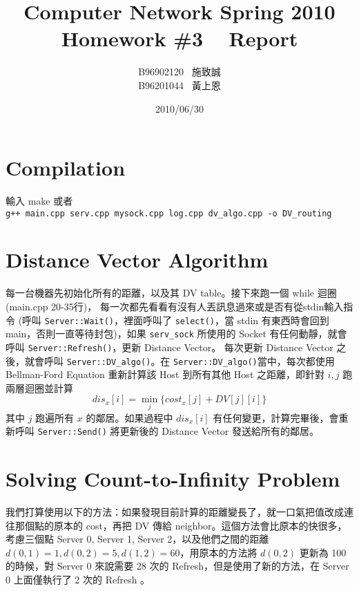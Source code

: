 \documentclass[11pt]{article}
\begin{document}
\begin{CJK}{UTF8}{cwmb}

\title{Computer Network Spring 2010\\Homework \#3 ~ Report}
\author{B96902120 ~施致誠\\B96201044~ 黃上恩}
\date{2010/06/30}
\maketitle

\section{Compilation}
輸入 make 或者\\
\verb|g++ main.cpp serv.cpp mysock.cpp log.cpp dv_algo.cpp -o DV_routing|\\

\section{Distance Vector Algorithm}
每一台機器先初始化所有的距離，以及其 DV table。接下來跑一個 while 迴圈(main.cpp 20-35行)，
每一次都先看看有沒有人丟訊息過來或是否有從stdin輸入指令 (呼叫 \verb|Server::Wait()|，裡面呼叫了 \verb|select()|，當 stdin 有東西時會回到 main，否則一直等待封包)，如果 \verb|serv_sock| 所使用的 Socket 有任何動靜，就會呼叫 \verb|Server::Refresh()|，更新 Distance Vector。
每次更新 Distance Vector 之後，就會呼叫 \verb|Server::DV_algo()|。在 \verb|Server::DV_algo()|當中，每次都使用 Bellman-Ford Equation 重新計算該 Host 到所有其他 Host 之距離，即針對 $i, j$ 跑兩層迴圈並計算
\[ dis_x[i] = \min_j\{ cost_x[j] + DV[j][i]\} \]
其中 $j$ 跑遍所有 $x$ 的鄰居。如果過程中 $dis_x[i]$ 有任何變更，計算完畢後，會重新呼叫 \verb|Server::Send()| 將更新後的 Distance Vector 發送給所有的鄰居。

\section{Solving Count-to-Infinity Problem}
我們打算使用以下的方法：如果發現目前計算的距離變長了，就一口氣把值改成連往那個點的原本的 cost，再把 DV 傳給 neighbor。這個方法會比原本的快很多，考慮三個點 Server 0, Server 1, Server 2，以及他們之間的距離 $d(0,1)=1, d(0,2)=5, d(1,2)=60$，用原本的方法將 $d(0,2)$ 更新為 100 的時候，對 Server 0 來說需要 28 次的 Refresh，但是使用了新的方法，在 Server 0 上面僅執行了 2 次的 Refresh 。

\end{CJK}
\end{document}

